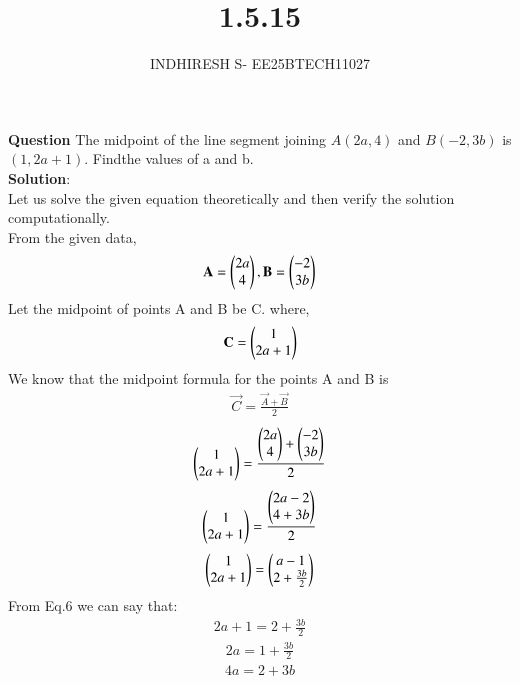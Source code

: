 \documentclass[journal]{IEEEtran}
\theoremstyle{remark}
\begin{document}

\onecolumn

\title{1.5.15}
\author{INDHIRESH S- EE25BTECH11027}
\maketitle


\renewcommand{\thefigure}{\theenumi}
\renewcommand{\thetable}{\theenumi}

\textbf{Question} The midpoint of the line segment joining $A(2a, 4)$ and $B(-2, 3b)$ is $(1, 2a + 1)$. Findthe values of a and b.\\
\textbf{Solution}:\\
Let us solve the given equation theoretically and then verify the solution computationally. \\
From the given data,
\begin{align}
\mathbf{A}= \begin{pmatrix}2a\\4\end{pmatrix} , \mathbf{B}=\begin{pmatrix}-2\\3b\end{pmatrix}
\end{align}
Let the midpoint of points A and B be C. where,
\begin{align}
    \mathbf{C}=\begin{pmatrix}1\\2a+1\end{pmatrix}
\end{align}
We know that the midpoint formula for the points A and B is
\begin{align}
    \vec{C}=\frac{\vec{A}+\vec{B}}{2}
    \end{align}
\begin{align}
    \begin{pmatrix}1\\2a+1\end{pmatrix}=\frac{\begin{pmatrix}2a\\4\end{pmatrix}+\begin{pmatrix}-2\\3b\end{pmatrix}}{2}
\end{align}
\begin{align}
    \begin{pmatrix}1\\2a+1\end{pmatrix}=\frac{\begin{pmatrix}2a-2\\4+3b\end{pmatrix}}{2}
\end{align}
\begin{align}
    \begin{pmatrix}1\\2a+1\end{pmatrix}=\begin{pmatrix}a-1\\2+\frac{3b}{2}\end{pmatrix}
\end{align}
From Eq.6 we can say that:
\begin{align}
    2a+1=2+\frac{3b}{2}
\end{align}
\begin{align}
    2a=1+\frac{3b}{2}
\end{align}
\begin{align}
    4a=2+3b
\end{align}
\end{document}
